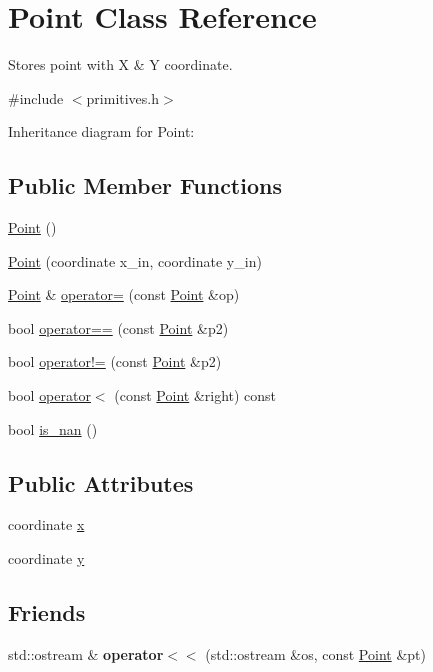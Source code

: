 \hypertarget{classPoint}{}\section{Point Class Reference}
\label{classPoint}


Stores point with X \& Y coordinate.  




{\ttfamily \#include $<$primitives.\+h$>$}



Inheritance diagram for Point\+:
\subsection*{Public Member Functions}
\begin{DoxyCompactItemize}
\item 
\hyperlink{classPoint_ad92f2337b839a94ce97dcdb439b4325a}{Point} ()
\item 
\hyperlink{classPoint_af7373698b9fafc53b0a5d06e511642e1}{Point} (coordinate x\+\_\+in, coordinate y\+\_\+in)
\item 
\hyperlink{classPoint}{Point} \& \hyperlink{classPoint_a2e142edc132377fdc6873f6549daab2d}{operator=} (const \hyperlink{classPoint}{Point} \&op)
\item 
bool \hyperlink{classPoint_ac7bc64b9a683d5fb35780c739779f2fc}{operator==} (const \hyperlink{classPoint}{Point} \&p2)
\item 
bool \hyperlink{classPoint_ade5f3908ec0e412aea8c3e12f5d0e26f}{operator!=} (const \hyperlink{classPoint}{Point} \&p2)
\item 
bool \hyperlink{classPoint_a2d285a505e84d64a96974d5247e8ae7a}{operator$<$} (const \hyperlink{classPoint}{Point} \&right) const
\item 
bool \hyperlink{classPoint_a2bc8aed929f6be2b543ba2f26b8a5f72}{is\+\_\+nan} ()
\end{DoxyCompactItemize}
\subsection*{Public Attributes}
\begin{DoxyCompactItemize}
\item 
coordinate \hyperlink{classPoint_a2e5bf2da8d7f35ef2ca707ae5ec1929b}{x}
\item 
coordinate \hyperlink{classPoint_a4390d37c7ed19ad07212fc84df2fe26e}{y}
\end{DoxyCompactItemize}
\subsection*{Friends}
\begin{DoxyCompactItemize}
\item 
\mbox{\label{classPoint_a2c120859855730a5ff9d2eaee48471c5}} 
std\+::ostream \& {\bfseries operator$<$$<$} (std\+::ostream \&os, const \hyperlink{classPoint}{Point} \&pt)
\end{DoxyCompactItemize}


